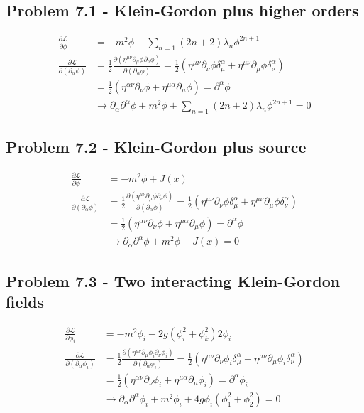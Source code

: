 \documentclass[10pt,a4paper]{book}
\theoremstyle{definition}
\begin{document}
\subsection{Problem 7.1 - Klein-Gordon plus higher orders}
\begin{align}
\frac{\partial\mathcal{L}}{\partial\phi}
&=-m^2\phi-\sum_{n=1}(2n+2)\lambda_n\phi^{2n+1}\\
\frac{\partial\mathcal{L}}{\partial(\partial_\alpha\phi)}
&=\frac{1}{2}\frac{\partial(\eta^{\mu\nu}\partial_\mu\phi\partial_\nu\phi)}{\partial(\partial_\alpha\phi)}
=\frac{1}{2}(\eta^{\mu\nu}\partial_\nu\phi\delta_\mu^\alpha+\eta^{\mu\nu}\partial_\mu\phi\delta_\nu^\alpha)\\
&=\frac{1}{2}(\eta^{\alpha\nu}\partial_\nu\phi+\eta^{\mu\alpha}\partial_\mu\phi)=\partial^\alpha\phi\\
&\rightarrow\partial_\alpha\partial^\alpha\phi+m^2\phi+\sum_{n=1}(2n+2)\lambda_n\phi^{2n+1}=0
\end{align}

\subsection{Problem 7.2 - Klein-Gordon plus source}
\begin{align}
\frac{\partial\mathcal{L}}{\partial\phi}
&=-m^2\phi+J(x)\\
\frac{\partial\mathcal{L}}{\partial(\partial_\alpha\phi)}
&=\frac{1}{2}\frac{\partial(\eta^{\mu\nu}\partial_\mu\phi\partial_\nu\phi)}{\partial(\partial_\alpha\phi)}
=\frac{1}{2}(\eta^{\mu\nu}\partial_\nu\phi\delta_\mu^\alpha+\eta^{\mu\nu}\partial_\mu\phi\delta_\nu^\alpha)\\
&=\frac{1}{2}(\eta^{\alpha\nu}\partial_\nu\phi+\eta^{\mu\alpha}\partial_\mu\phi)=\partial^\alpha\phi\\
&\rightarrow\partial_\alpha\partial^\alpha\phi+m^2\phi-J(x)=0
\end{align}

\subsection{Problem 7.3 - Two interacting Klein-Gordon fields}
\begin{align}
\frac{\partial\mathcal{L}}{\partial\phi_i}
&=-m^2\phi_i-2g(\phi_i^2+\phi_k^2)2\phi_i\\
\frac{\partial\mathcal{L}}{\partial(\partial_\alpha\phi_i)}
&=\frac{1}{2}\frac{\partial(\eta^{\mu\nu}\partial_\mu\phi_i\partial_\nu\phi_i)}{\partial(\partial_\alpha\phi_i)}
=\frac{1}{2}(\eta^{\mu\nu}\partial_\nu\phi_i\delta_\mu^\alpha+\eta^{\mu\nu}\partial_\mu\phi_i\delta_\nu^\alpha)\\
&=\frac{1}{2}(\eta^{\alpha\nu}\partial_\nu\phi_i+\eta^{\mu\alpha}\partial_\mu\phi_i)=\partial^\alpha\phi_i\\
&\rightarrow\partial_\alpha\partial^\alpha\phi_i+m^2\phi_i+4g\phi_i(\phi_1^2+\phi_2^2)=0
\end{align}
\end{document}
